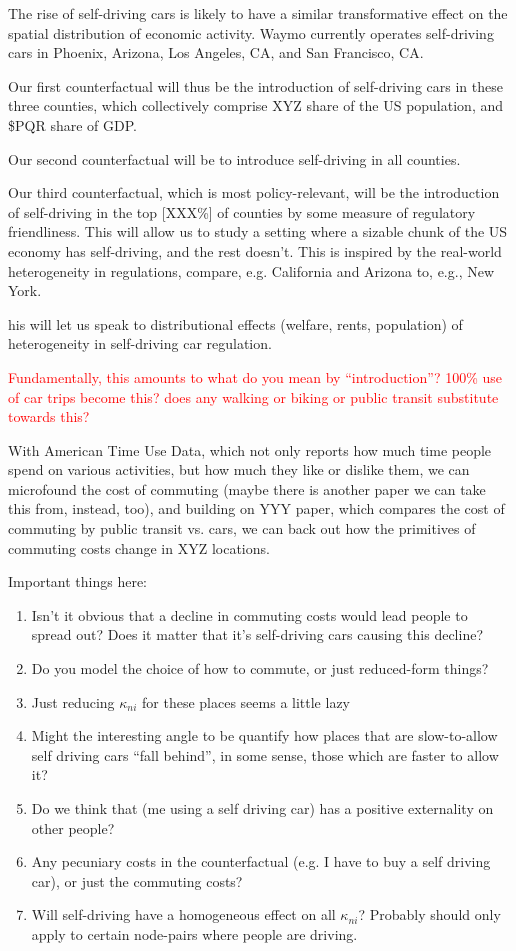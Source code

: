 \documentclass{article}
\begin{document}
The rise of self-driving cars is likely to have a similar transformative effect on the spatial distribution of economic activity.
Waymo currently operates self-driving cars in Phoenix, Arizona, Los Angeles, CA, and San Francisco, CA.



Our first counterfactual will thus be the introduction of self-driving cars in these three counties, which collectively comprise 
XYZ share of the US population, and  \$PQR share of GDP.

Our second counterfactual will be to introduce self-driving in all counties.

Our third counterfactual, which is most policy-relevant, will be the introduction of self-driving in the top [XXX\%] of counties by some measure of regulatory friendliness.
 This will allow us to study a setting where a sizable chunk of the US economy has self-driving, and the rest doesn't. This is inspired by the real-world heterogeneity in regulations, compare, e.g. California and Arizona to, e.g., New York.
 
 his will let us speak to distributional effects (welfare, rents, population) of heterogeneity in self-driving car regulation.

\textcolor{red}{Fundamentally, this amounts to what do you mean by ``introduction''? 100\% use of car trips become this?
does any walking or biking or public transit substitute towards this?}

With American Time Use Data, which not only reports how much time people spend on various activities, but how much they like or dislike them, we can microfound the cost of commuting (maybe there is another paper we can take this from, instead, too), and building on YYY paper, which compares the cost of commuting by public transit vs. cars, 
we can back out how the primitives of commuting costs change in XYZ locations.



Important things here:
\begin{enumerate}
    \item Isn't it obvious that a decline in commuting costs would lead people to spread out? Does it matter that it's self-driving cars causing this decline? 

    \item Do you model the choice of how to commute, or just reduced-form things?
\item Just reducing $\kappa_{ni}$ for these places seems a little lazy
\item Might the interesting angle to be quantify how places that are slow-to-allow self driving cars ``fall behind'', in some sense, those which are faster to allow it? 
\item Do we think that (me using a self driving car) has a positive externality on other people?
\item Any pecuniary costs in the counterfactual (e.g. I have to buy a self driving car), or just the commuting costs?
\item Will self-driving have a homogeneous effect on all $\kappa_{ni}$? Probably should only apply to certain node-pairs where people are driving.
\end{enumerate}
\end{document}
